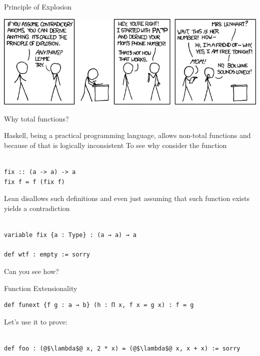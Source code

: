 \documentclass[pdf]{beamer}
\begin{document}
\begin{frame}{Principle of Explosion}
  \begin{center}
    \includegraphics[scale=0.48]{images/principle_of_explosion}
  \end{center}
\end{frame}

\begin{frame}[fragile]{Why total functions?}
  \begin{outline}
    \1 Haskell, being a practical programming language, allows non-total functions and because of that is logically inconsistent
    \1 To see why consider the function
    \\~\
    \begin{verbatim}
fix :: (a -> a) -> a
fix f = f (fix f)
    \end{verbatim}
    \pause
    \1 Lean disallows such definitions and even just assuming that such function exists yields a contradiction
    \\~\
    \begin{verbatim}
variable fix {a : Type} : (a → a) → a

def wtf : empty := sorry
    \end{verbatim}
    \1 Can you see how?
  \end{outline}
\end{frame}

\begin{frame}[fragile]{Function Extensionality}
  \begin{outline}
    \begin{verbatim}
def funext {f g : a → b} (h : Π x, f x = g x) : f = g
    \end{verbatim}
    \pause
    \1 Let's use it to prove:
    \\~\
    \begin{verbatim}
def foo : (@$\lambda$@ x, 2 * x) = (@$\lambda$@ x, x + x) := sorry
    \end{verbatim}
  \end{outline}
\end{frame}
\end{document}
